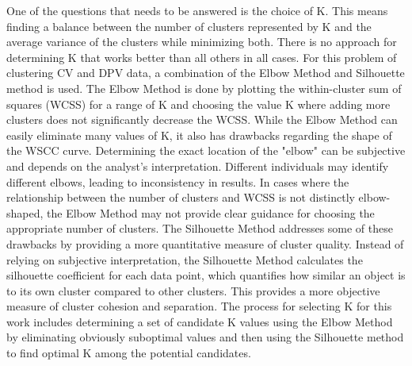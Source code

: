 One of the questions that needs to be answered is the choice of K. This means finding a balance between the number of clusters represented by K and the average variance of the clusters while minimizing both. There is no approach for determining K that works better than all others in all cases. For this problem of clustering CV and DPV data, a combination of the Elbow Method and Silhouette method is used. The Elbow Method is done by plotting the within-cluster sum of squares (WCSS) for a range of K and choosing the value K where adding more clusters does not significantly decrease the WCSS. While the Elbow Method can easily eliminate many values of K, it also has drawbacks regarding the shape of the WSCC curve. Determining the exact location of the "elbow" can be subjective and depends on the analyst's interpretation. Different individuals may identify different elbows, leading to inconsistency in results. In cases where the relationship between the number of clusters and WCSS is not distinctly elbow-shaped, the Elbow Method may not provide clear guidance for choosing the appropriate number of clusters. The Silhouette Method addresses some of these drawbacks by providing a more quantitative measure of cluster quality. Instead of relying on subjective interpretation, the Silhouette Method calculates the silhouette coefficient for each data point, which quantifies how similar an object is to its own cluster compared to other clusters. This provides a more objective measure of cluster cohesion and separation. The process for selecting K for this work includes determining a set of candidate K values using the Elbow Method by eliminating obviously suboptimal values and then using the Silhouette method to find optimal K among the potential candidates. 
